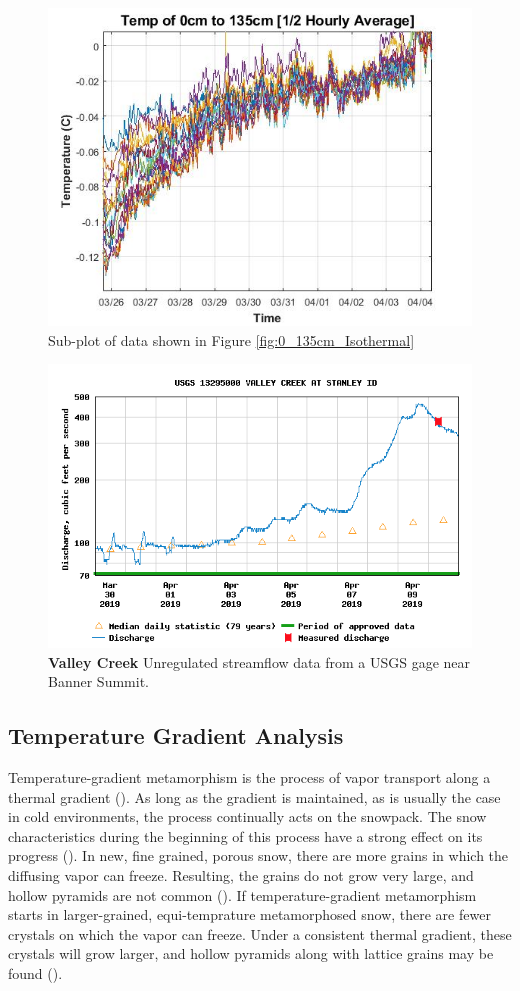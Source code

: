  \begin{figure}
    \centering
    \includegraphics[width=0.7\linewidth]{figures/0_135cm_zoom.jpg}
    \caption{Sub-plot of data shown in Figure \ref{fig:0_135cm_Isothermal}}
    \label{fig:0_135cm_Zoom}
 \end{figure}

\begin{figure}
    \centering
    \includegraphics[width=0.8\linewidth]{figures/ValleyCreek_Gage.png}
    \caption{\textbf{Valley Creek} Unregulated streamflow data from a USGS gage near Banner Summit.}
    \label{fig:ValleyCreek}
 \end{figure}

\subsection{Temperature Gradient Analysis}
Temperature-gradient metamorphism is the process of vapor transport along a thermal gradient (\cite{sommerfeld_1970}). As long as the gradient is maintained, as is usually the case in cold environments, the process continually acts on the snowpack. The snow characteristics during the beginning of this process have a strong effect on its progress (\cite{sommerfeld_1970}). In new, fine grained, porous snow, there are more grains in which the diffusing vapor can freeze. Resulting, the grains do not grow very large, and hollow pyramids are not common (\cite{sommerfeld_1970}). If temperature-gradient metamorphism starts in larger-grained, equi-temprature metamorphosed snow, there are fewer crystals on which the vapor can freeze. Under a consistent thermal gradient, these crystals will grow larger, and hollow pyramids along with lattice grains may be found (\cite{akitaya_1967}). 

